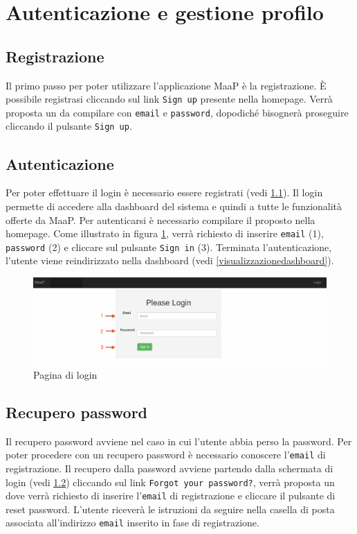 \section{Autenticazione e gestione profilo}

	\subsection{Registrazione}
	\label{registrazione}

	Il primo passo per poter utilizzare l'applicazione MaaP è la registrazione. \`E possibile registrasi cliccando sul link \texttt{Sign up} presente nella homepage. Verrà proposta un  da compilare con \texttt{email} e \texttt{password}, dopodiché bisognerà proseguire cliccando il pulsante \texttt{Sign up}.

	\nyi

	\subsection{Autenticazione}
	\label{autenticazione}
	Per poter effettuare il login è necessario essere registrati (vedi \ref{registrazione}). Il login permette di accedere alla dashboard del sistema e quindi a tutte le funzionalità offerte da MaaP. Per autenticarsi è necessario compilare il  proposto nella homepage. Come illustrato in figura \ref{fig:login}, verrà richiesto di inserire \texttt{email} (1), \texttt{password} (2) e cliccare sul pulsante \texttt{Sign in} (3). Terminata l'autenticazione, l'utente viene reindirizzato nella dashboard (vedi \ref{visualizzazionedashboard}).

	\begin{figure}[H]
	\label{fig:login}
		\centering \includegraphics[width=1\textwidth]{img/login.png}
	\caption{Pagina di login}
	\end{figure}

	\subsection{Recupero password}
	\label{recuperopassword}
	Il recupero password avviene nel caso in cui l'utente abbia perso la password. Per poter procedere con un recupero password è necessario conoscere l'\texttt{email} di registrazione. Il recupero dalla password avviene partendo dalla schermata di login (vedi \ref{autenticazione}) cliccando sul link \texttt{Forgot your password?}, verrà proposta un  dove verrà richiesto di inserire l'\texttt{email} di registrazione e cliccare il pulsante di reset password. L'utente riceverà le istruzioni da seguire nella casella di posta associata all'indirizzo \texttt{email} inserito in fase di registrazione.

